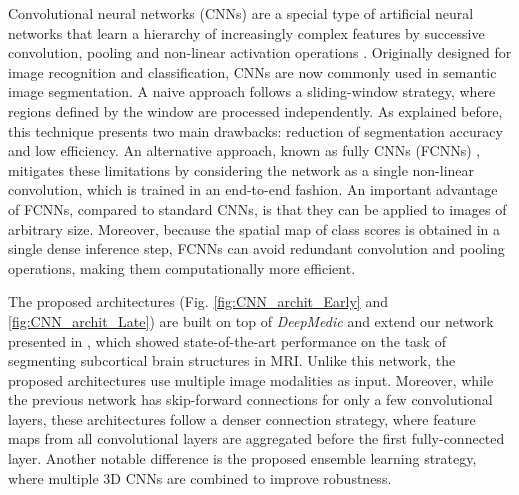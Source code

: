 \documentclass[twoside,espcrc2]{elsarticle}
\begin{document}

Convolutional neural networks (CNNs) are a special type of artificial neural networks that learn a hierarchy of increasingly complex features by successive convolution, pooling and non-linear activation operations \cite{lecun1998gradient,krizhevsky2012imagenet}. Originally designed for image recognition and classification, CNNs are now commonly used in semantic image segmentation. A naive approach follows a sliding-window strategy, where regions defined by the window are processed independently. As explained before, this technique presents two main drawbacks: reduction of segmentation accuracy and low efficiency. An alternative approach, known as fully CNNs (FCNNs) \cite{long2015fully}, mitigates these limitations by considering the network as a single non-linear convolution, which is trained in an end-to-end fashion. An important advantage of FCNNs, compared to standard CNNs, is that they can be applied to images of arbitrary size. Moreover, because the spatial map of class scores is obtained in a single dense inference step, FCNNs can avoid redundant convolution and pooling operations, making them computationally more efficient. 


The proposed architectures (Fig. \ref{fig:CNN_archit_Early} and \ref{fig:CNN_archit_Late}) are built on top of \textit{DeepMedic} \cite{kamnitsas2017efficient} and 
extend our network presented in \cite{DolzNeuro2017}, which showed state-of-the-art performance on the task of segmenting subcortical brain structures in MRI. Unlike this network, the proposed architectures use multiple image modalities as input. Moreover, while the previous network has skip-forward connections for only a few convolutional layers, these architectures follow a denser connection strategy, where feature maps from all convolutional layers are aggregated before the first fully-connected layer. Another notable difference is the proposed ensemble learning strategy, where multiple 3D CNNs are combined to improve robustness.
\end{document}
